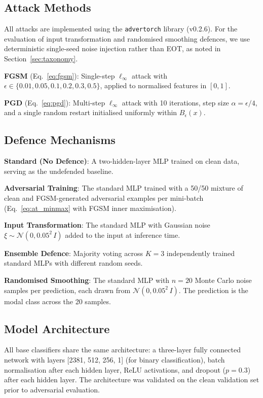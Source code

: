\documentclass[conference]{IEEEtran}
\begin{document}
\subsection{Attack Methods}

All attacks are implemented using the \texttt{advertorch} library (v0.2.6). For the evaluation of input transformation and randomised smoothing defences, we use deterministic single-seed noise injection rather than EOT, as noted in Section~\ref{sec:taxonomy}.

\textbf{FGSM} (Eq.~\ref{eq:fgsm}): Single-step $\ell_\infty$ attack with $\epsilon \in \{0.01, 0.05, 0.1, 0.2, 0.3, 0.5\}$, applied to normalised features in $[0,1]$.

\textbf{PGD} (Eq.~\ref{eq:pgd}): Multi-step $\ell_\infty$ attack with 10 iterations, step size $\alpha = \epsilon/4$, and a single random restart initialised uniformly within $B_\epsilon(x)$.

\subsection{Defence Mechanisms}

\textbf{Standard (No Defence)}: A two-hidden-layer MLP trained on clean data, serving as the undefended baseline.

\textbf{Adversarial Training}: The standard MLP trained with a 50/50 mixture of clean and FGSM-generated adversarial examples per mini-batch (Eq.~\ref{eq:at_minmax} with FGSM inner maximisation).

\textbf{Input Transformation}: The standard MLP with Gaussian noise $\xi \sim \mathcal{N}(0, 0.05^2\,I)$ added to the input at inference time.

\textbf{Ensemble Defence}: Majority voting across $K = 3$ independently trained standard MLPs with different random seeds.

\textbf{Randomised Smoothing}: The standard MLP with $n = 20$ Monte Carlo noise samples per prediction, each drawn from $\mathcal{N}(0, 0.05^2\,I)$. The prediction is the modal class across the 20 samples.

\subsection{Model Architecture}

All base classifiers share the same architecture: a three-layer fully connected network with layers [2381, 512, 256, 1] (for binary classification), batch normalisation after each hidden layer, ReLU activations, and dropout ($p = 0.3$) after each hidden layer. The architecture was validated on the clean validation set prior to adversarial evaluation.
\end{document}
